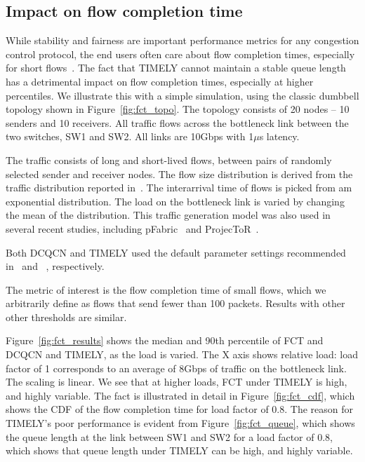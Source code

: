 \subsection {Impact on flow completion time}

While stability and fairness are important performance metrics for any
congestion control protocol, the end users often care about flow completion
times, especially for short flows~\cite{rcp}. The fact that TIMELY cannot
maintain a stable queue length has a detrimental impact on flow completion
times, especially at higher percentiles. We illustrate this with a simple
simulation, using the classic dumbbell topology shown in
Figure~\ref{fig:fct_topo}. The topology consists of 20 nodes -- 10 senders and
10 receivers. All traffic flows across the bottleneck link between the two
switches, SW1 and SW2. All links are 10Gbps with 1$\mu$s latency.

The traffic consists  of long and short-lived flows, between pairs of randomly
selected sender and receiver nodes. The flow size distribution is derived from
the traffic distribution reported in~\cite{dctcp}. The interarrival time of
flows is picked from am exponential distribution. The load on the bottleneck
link is varied by changing the mean of the distribution. This traffic generation
model was also used in several recent studies, including pFabric~\cite{pfabric}
and ProjecToR~\cite{projector}. 

Both DCQCN and TIMELY used the default parameter settings recommended
in~\cite{dcqcn} and ~\cite{timely}, respectively.

The metric of interest is the flow completion time of small flows, which we
arbitrarily define as flows that send fewer than 100 packets. Results with other
other thresholds are similar.

Figure~\ref{fig:fct_results} shows the median and 90th percentile of FCT and
DCQCN and TIMELY, as the load is varied.  The X axis shows relative load: load
factor of 1 corresponds to an average of 8Gbps of traffic on the bottleneck
link. The scaling is linear. We see that at higher loads, FCT under TIMELY is
high, and highly variable. The fact is illustrated in detail in
Figure~\ref{fig:fct_cdf}, which shows the CDF of the flow completion time for
load factor of 0.8. The reason for TIMELY's poor performance is evident from
Figure~\ref{fig:fct_queue}, which shows the queue length at the link between
SW1 and SW2 for a load factor of 0.8, which shows that queue length under TIMELY
can be high, and highly variable.

